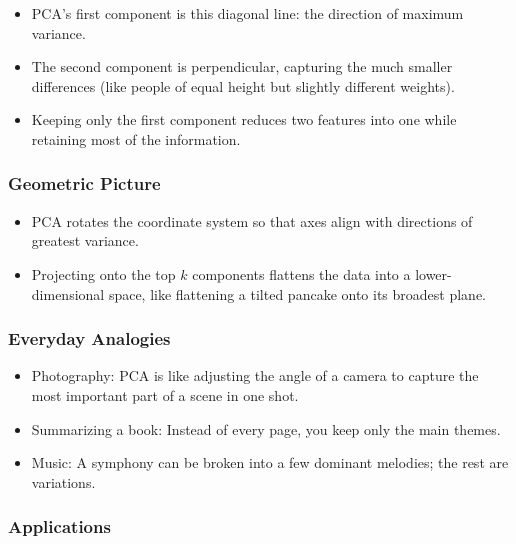 \documentclass[
  letterpaper,
  DIV=11,
  numbers=noendperiod]{scrreprt}
\providecommand{\tightlist}{%
  \setlength{\itemsep}{0pt}\setlength{\parskip}{0pt}}
\begin{document}
\begin{itemize}
\tightlist
\item
  PCA's first component is this diagonal line: the direction of maximum
  variance.
\item
  The second component is perpendicular, capturing the much smaller
  differences (like people of equal height but slightly different
  weights).
\item
  Keeping only the first component reduces two features into one while
  retaining most of the information.
\end{itemize}

\subsubsection{Geometric Picture}\label{geometric-picture-2}

\begin{itemize}
\tightlist
\item
  PCA rotates the coordinate system so that axes align with directions
  of greatest variance.
\item
  Projecting onto the top \(k\) components flattens the data into a
  lower-dimensional space, like flattening a tilted pancake onto its
  broadest plane.
\end{itemize}

\subsubsection{Everyday Analogies}\label{everyday-analogies-80}

\begin{itemize}
\tightlist
\item
  Photography: PCA is like adjusting the angle of a camera to capture
  the most important part of a scene in one shot.
\item
  Summarizing a book: Instead of every page, you keep only the main
  themes.
\item
  Music: A symphony can be broken into a few dominant melodies; the rest
  are variations.
\end{itemize}

\subsubsection{Applications}\label{applications-44}
\end{document}
